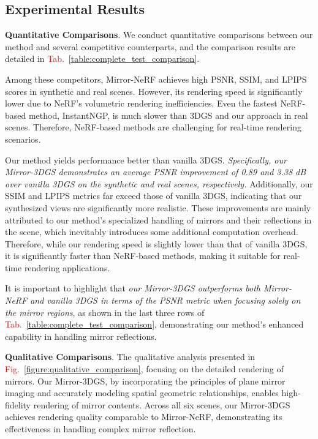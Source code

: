 \documentclass[conference]{IEEEtran}
\begin{document}
\subsection{Experimental Results}

\noindent\textbf{Quantitative Comparisons}.
We conduct quantitative comparisons between our method and several competitive counterparts, and
the comparison results are detailed in \textcolor{red}{Tab.~\ref{table:complete_test_comparison}}.

Among these competitors, Mirror-NeRF achieves high PSNR, SSIM, and LPIPS scores in synthetic and real scenes. However, its rendering speed is significantly lower due to NeRF's volumetric rendering inefficiencies. Even the fastest NeRF-based method, InstantNGP, is much slower than 3DGS and our approach in real scenes. Therefore, NeRF-based methods are challenging for real-time rendering scenarios.

Our method yields performance better than vanilla 3DGS. \textit{Specifically, our Mirror-3DGS demonstrates an average PSNR improvement of 0.89 and 3.38 dB over vanilla 3DGS on the synthetic and real scenes, respectively.} Additionally, our SSIM and LPIPS metrics far exceed those of vanilla 3DGS, indicating that our synthesized views are significantly more realistic. These improvements are mainly attributed to our method's specialized handling of mirrors and their reflections in the scene, which inevitably introduces some additional computation overhead. Therefore, while our rendering speed is slightly lower than that of vanilla 3DGS, it is significantly faster than NeRF-based methods, making it suitable for real-time rendering applications. 

It is important to highlight that \textit{our Mirror-3DGS outperforms both Mirror-NeRF and vanilla 3DGS in terms of the PSNR metric when focusing solely on the mirror regions}, as shown in the last three rows of \textcolor{red}{Tab.~\ref{table:complete_test_comparison}}, demonstrating our method's enhanced capability in handling mirror reflections.


\noindent\textbf{Qualitative Comparisons}.
The qualitative analysis presented in
\textcolor{red}{Fig.~\ref{figure:qualitative_comparison}}, focusing on the detailed rendering of mirrors.  Our Mirror-3DGS, by incorporating the principles of plane mirror imaging and accurately modeling spatial geometric relationships, enables high-fidelity rendering of mirror contents. Across all six scenes, our Mirror-3DGS achieves rendering quality comparable to Mirror-NeRF, demonstrating its effectiveness in handling complex mirror reflection.
\end{document}
